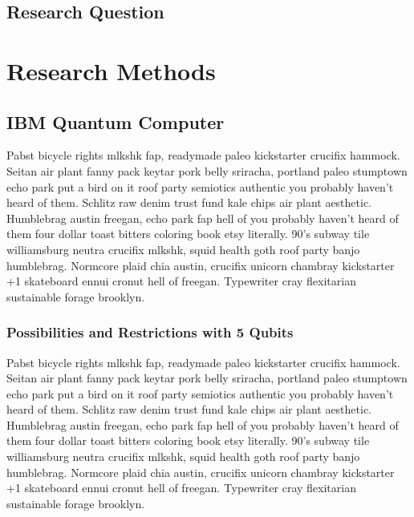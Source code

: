 \documentclass[a4paper]{article}
\begin{document}
\subsection{Research Question}
\label{subsec:researchquestion}


\section{Research Methods}
\label{sec:researchmethods}


\subsection{IBM Quantum Computer}
\label{subsec:ibmquantumcomputer}

Pabst bicycle rights mlkshk fap, readymade paleo kickstarter crucifix hammock. Seitan air plant fanny pack keytar pork belly sriracha, portland paleo stumptown echo park put a bird on it roof party semiotics authentic you probably haven't heard of them. Schlitz raw denim trust fund kale chips air plant aesthetic. Humblebrag austin freegan, echo park fap hell of you probably haven't heard of them four dollar toast bitters coloring book etsy literally. 90's subway tile williamsburg neutra crucifix mlkshk, squid health goth roof party banjo humblebrag. Normcore plaid chia austin, crucifix unicorn chambray kickstarter +1 skateboard ennui cronut hell of freegan. Typewriter cray flexitarian sustainable forage brooklyn.

\subsubsection{Possibilities and Restrictions with 5 Qubits}
\label{subsubsec:possibilitiesandrestrictions}

Pabst bicycle rights mlkshk fap, readymade paleo kickstarter crucifix hammock. Seitan air plant fanny pack keytar pork belly sriracha, portland paleo stumptown echo park put a bird on it roof party semiotics authentic you probably haven't heard of them. Schlitz raw denim trust fund kale chips air plant aesthetic. Humblebrag austin freegan, echo park fap hell of you probably haven't heard of them four dollar toast bitters coloring book etsy literally. 90's subway tile williamsburg neutra crucifix mlkshk, squid health goth roof party banjo humblebrag. Normcore plaid chia austin, crucifix unicorn chambray kickstarter +1 skateboard ennui cronut hell of freegan. Typewriter cray flexitarian sustainable forage brooklyn.
\end{document}
